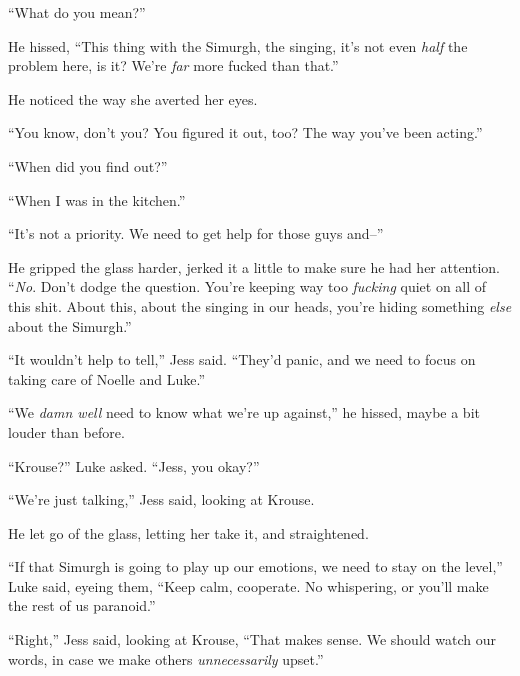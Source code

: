``What do you mean?''



He hissed, ``This thing with the Simurgh, the singing, it's not even \emph{half} the problem here, is it?  We're \emph{far} more fucked than that.''



He noticed the way she averted her eyes.



``You know, don't you?  You figured it out, too?  The way you've been acting.''



``When did you find out?''



``When I was in the kitchen.''



``It's not a priority.  We need to get help for those guys and--''



He gripped the glass harder, jerked it a little to make sure he had her attention.  ``\emph{No}.  Don't dodge the question.  You're keeping way too \emph{fucking} quiet on all of this shit.  About this, about the singing in our heads, you're hiding something \emph{else} about the Simurgh.''



``It wouldn't help to tell,'' Jess said.  ``They'd panic, and we need to focus on taking care of Noelle and Luke.''



``We \emph{damn well} need to know what we're up against,'' he hissed, maybe a bit louder than before.



``Krouse?'' Luke asked.  ``Jess, you okay?''



``We're just talking,'' Jess said, looking at Krouse.



He let go of the glass, letting her take it, and straightened.



``If that Simurgh is going to play up our emotions, we need to stay on the level,'' Luke said, eyeing them,  ``Keep calm, cooperate.  No whispering, or you'll make the rest of us paranoid.''



``Right,'' Jess said, looking at Krouse, ``That makes sense.  We should watch our words, in case we make others \emph{unnecessarily} upset.''



